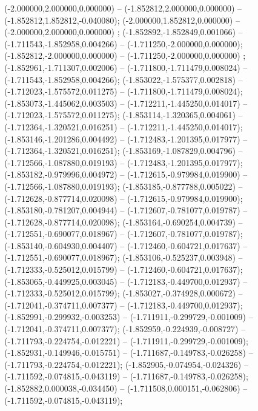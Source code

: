  (-2.000000,2.000000,0.000000) -- (-1.852812,2.000000,0.000000) -- (-1.852812,1.852812,-0.040080);
 (-2.000000,1.852812,0.000000) -- (-2.000000,2.000000,0.000000) ;
 (-1.852892,-1.852849,0.001066) -- (-1.711543,-1.852958,0.004266) -- (-1.711250,-2.000000,0.000000);
 (-1.852812,-2.000000,0.000000) -- (-1.711250,-2.000000,0.000000) ;
 (-1.852961,-1.711307,0.002006) -- (-1.711800,-1.711479,0.008024) -- (-1.711543,-1.852958,0.004266);
 (-1.853022,-1.575377,0.002818) -- (-1.712023,-1.575572,0.011275) -- (-1.711800,-1.711479,0.008024);
 (-1.853073,-1.445062,0.003503) -- (-1.712211,-1.445250,0.014017) -- (-1.712023,-1.575572,0.011275);
 (-1.853114,-1.320365,0.004061) -- (-1.712364,-1.320521,0.016251) -- (-1.712211,-1.445250,0.014017);
 (-1.853146,-1.201286,0.004492) -- (-1.712483,-1.201395,0.017977) -- (-1.712364,-1.320521,0.016251);
 (-1.853169,-1.087829,0.004796) -- (-1.712566,-1.087880,0.019193) -- (-1.712483,-1.201395,0.017977);
 (-1.853182,-0.979996,0.004972) -- (-1.712615,-0.979984,0.019900) -- (-1.712566,-1.087880,0.019193);
 (-1.853185,-0.877788,0.005022) -- (-1.712628,-0.877714,0.020098) -- (-1.712615,-0.979984,0.019900);
 (-1.853180,-0.781207,0.004944) -- (-1.712607,-0.781077,0.019787) -- (-1.712628,-0.877714,0.020098);
 (-1.853164,-0.690254,0.004739) -- (-1.712551,-0.690077,0.018967) -- (-1.712607,-0.781077,0.019787);
 (-1.853140,-0.604930,0.004407) -- (-1.712460,-0.604721,0.017637) -- (-1.712551,-0.690077,0.018967);
 (-1.853106,-0.525237,0.003948) -- (-1.712333,-0.525012,0.015799) -- (-1.712460,-0.604721,0.017637);
 (-1.853065,-0.449925,0.003045) -- (-1.712183,-0.449700,0.012937) -- (-1.712333,-0.525012,0.015799);
 (-1.853027,-0.374928,0.000672) -- (-1.712041,-0.374711,0.007377) -- (-1.712183,-0.449700,0.012937);
 (-1.852991,-0.299932,-0.003253) -- (-1.711911,-0.299729,-0.001009) -- (-1.712041,-0.374711,0.007377);
 (-1.852959,-0.224939,-0.008727) -- (-1.711793,-0.224754,-0.012221) -- (-1.711911,-0.299729,-0.001009);
 (-1.852931,-0.149946,-0.015751) -- (-1.711687,-0.149783,-0.026258) -- (-1.711793,-0.224754,-0.012221);
 (-1.852905,-0.074954,-0.024326) -- (-1.711592,-0.074815,-0.043119) -- (-1.711687,-0.149783,-0.026258);
 (-1.852882,0.000038,-0.034450) -- (-1.711508,0.000151,-0.062806) -- (-1.711592,-0.074815,-0.043119);
